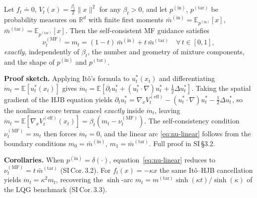 \documentclass[11pt,onecolumn]{article}
\newcommand{\Rbb}{\mathbb{R}}
\newcommand{\ptar}{p^{(\mathrm{tar})}}
\newcommand{\pin}{p^{(\mathrm{in})}}
\newcommand{\MF}{\mathrm{MF}}
\newcommand{\Veff}{V^{(\mathrm{eff})}}
\begin{document}
\begin{tcolorbox}[colback=gray!7,colframe=gray!45,
  title={\small\bfseries \color{black} Theorem (SI\,Thm.\,3.1)}]
\small
Let $f_t \doteq  0$, $V_t(x)=\tfrac{\beta_t}{2}\|x\|^2$ for any
$\beta_t>0$, and let $\pin$, $\ptar$ be probability measures on
$\Rbb^d$ with finite first moments
$\bar m^{(\mathrm{in})}=\mathbb{E}_{\pin}[x]$,
$\bar m^{(\mathrm{tar})}=\mathbb{E}_{\ptar}[x]$.
Then the self-consistent MF guidance satisfies
\begin{equation}
  \nu_t^{(\MF)} = m_t
  = (1-t)\,\bar m^{(\mathrm{in})} + t\,\bar m^{(\mathrm{tar})}
  \quad\forall\,t\in[0,1],
  \label{eq:nu-linear}
\end{equation}
\emph{exactly}, independently of $\beta_t$, the number and geometry
of mixture components, and the shape of $\pin$ and $\ptar$.
\end{tcolorbox}

\textbf{Proof sketch.}
Applying It\^o's formula to $u_t^*(x_t)$ and differentiating
$\dot m_t = \mathbb{E}[u_t^*(x_t)]$ gives
$\ddot m_t
= \mathbb{E}[\partial_t u_t^* + (u_t^*\cdot\nabla)u_t^*
+ \tfrac{1}{2}\Delta u_t^*]$.
Taking the spatial gradient of the HJB equation yields
$\partial_t u_t^*
= \nabla_x\Veff_t - (u_t^*\cdot\nabla)u_t^* - \tfrac{1}{2}\Delta u_t^*$,
so the nonlinear score terms cancel \emph{exactly} inside
$\ddot m_t$, leaving
$\ddot m_t = \mathbb{E}[\nabla_x\Veff_t(x_t)]
= \beta_t(m_t - \nu_t^{(\MF)})$.
The self-consistency condition $\nu_t^{(\MF)}=m_t$ then forces
$\ddot m_t = 0$, and the linear arc
\eqref{eq:nu-linear} follows from the boundary conditions
$m_0=\bar m^{(\mathrm{in})}$, $m_1=\bar m^{(\mathrm{tar})}$.
Full proof in SI\,\S3.2.

\textbf{Corollaries.}
When $\pin = \delta(\cdot)$, equation~\eqref{eq:nu-linear} reduces to
$\nu_t^{(\MF)} = t\,\bar m^{(\mathrm{tar})}$ (SI\,Cor.\,3.2).
For $f_t(x) = -\kappa x$ the same It\^o--HJB cancellation yields
$\ddot m_t = \kappa^2 m_t$, recovering the $\sinh$-arc
$m_t = m^{(\mathrm{tar})}\sinh(\kappa t)/\sinh(\kappa)$
of the LQG benchmark (SI\,Cor.\,3.3).
\end{document}
